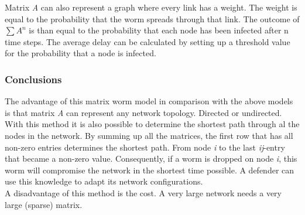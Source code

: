 Matrix \textit{A} can also represent a graph where every link has a weight. The weight is equal to the probability that the worm spreads through that link. The outcome of $ \sum A^{n}$ is than equal to the probability that each node has been infected after n time steps. The average delay can be calculated by setting up a threshold value for the probability that a node is infected. \\

\subsubsection*{Conclusions}
The advantage of this matrix worm model in comparison with the above models is that matrix  \textit{A} can represent any network topology. Directed or undirected. \\
With this method it is also possible to determine the shortest path through al the nodes in the network. By summing up all the matrices, the first row that has all non-zero entries determines the shortest path. From node \textit{i} to the last \textit{ij}-entry that became a non-zero value. Consequently, if a worm is dropped on node \textit{i}, this worm will compromise the network in the shortest time possible. A defender can use this knowledge to adapt its network configurations. \\
A disadvantage of this method is the cost. A very large network needs a very large (sparse) matrix. 
